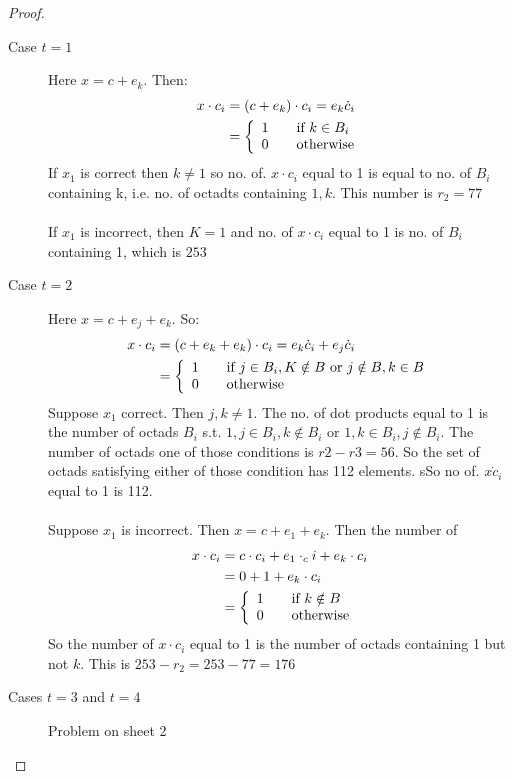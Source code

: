 \documentclass[]{article}
\theoremstyle{definition}
\theoremstyle{remark}
\numberwithin{equation}{section}
\begin{document}
		\begin{proof}\hfill
		\begin{description}
			\item[Case $t=1$]
				Here $x = c + e_k$. Then:
				\begin{align*}
					x \cdot c_i &= (c + e_k) \cdot c_i = e_k \dot c_i \\
								&= \left\{
							  \begin{array}{l l}
							   1 & \quad \text{if $k \in B_i$}\\
							   0 & \quad \text{otherwise}
							  \end{array} \right.
				\end{align*}
				If $x_1$ is correct then $k \neq 1$ so no. of. $x \cdot c_i$ equal to 1 is equal to no. of $B_i$ containing k, i.e. no. of octadts containing $1, k$. This number is $r_2 = 77$\\
				\\
				If $x_1$ is incorrect, then $K=1$ and no. of $x \cdot c_i$ equal to 1 is no. of $B_i$ containing 1, which is $253$
			\item[Case $t=2$]
				Here $x = c + e_j +e_k$. So:
				\begin{align*}
					x \cdot c_i &= (c + e_k + e_k) \cdot c_i = e_k \dot c_i + e_j \dot c_i \\
								&= \left\{
							  \begin{array}{l l}
							   1 & \quad \text{if $j \in B_i, K\notin B$ or $j \notin B, k \in B$}\\
							   0 & \quad \text{otherwise}
							  \end{array} \right.
				\end{align*}
				Suppose $x_1$ correct. Then $j, k \neq 1$. The no. of dot products equal to 1 is the number of octads $B_i$ s.t. $1,j \in B_i, k \notin B_i$ or $1,k \in B_i, j \notin B_i$.
				The number of octads one of those conditions is $r2-r3 = 56$. So the set of octads satisfying either of those condition has 112 elements. sSo no of. $x \dot c_i$  equal to 1 is 112.\\
				\\
				Suppose $x_1$ is incorrect. Then $x = c + e_1 + e_k$. Then the number of
				\begin{align*}
					x \cdot c_i &= c \cdot c_i + e_1 \cdot _ci + e_k \cdot c_i\\
								&= 0 + 1 + e_k \cdot c_i\\
								&= \left\{
							  \begin{array}{l l}
							   1 & \quad \text{if $k\notin B$}\\
							   0 & \quad \text{otherwise}
							  \end{array} \right.
				\end{align*}
				So the number of $x \cdot c_i$ equal to 1 is the number of octads containing 1 but not $k$. This is $253 - r_2 = 253 - 77 = 176$
			\item[Cases $t=3$ and $t=4$]
				Problem on sheet 2
		\end{description}
		\end{proof}
\end{document}
